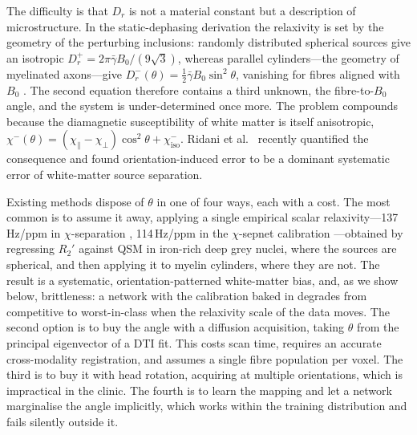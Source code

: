\documentclass[AMA,STIX2COL,Linenumberson]{MRM}
\begin{document}
The difficulty is that $D_r$ is not a material constant but a description of microstructure. In the static-dephasing derivation the relaxivity is set by the geometry of the perturbing inclusions: randomly distributed spherical sources give an isotropic $D_r^{+} = 2\pi\bar\gamma B_0/(9\sqrt{3})$, whereas parallel cylinders---the geometry of myelinated axons---give $D_r^{-}(\theta) = \tfrac{1}{2}\bar\gamma B_0 \sin^2\theta$, vanishing for fibres aligned with $B_0$ \cite{yablonskiy_theory_1994,brown_distribution_1961}. The second equation therefore contains a third unknown, the fibre-to-$B_0$ angle, and the system is under-determined once more. The problem compounds because the diamagnetic susceptibility of white matter is itself anisotropic, $\chi^{-}(\theta) = (\chi_{\parallel}-\chi_{\perp})\cos^{2}\theta + \chi^{-}_{\mathrm{iso}}$. Ridani et al.\ \cite{ridani_realistic_2026} recently quantified the consequence and found orientation-induced error to be a dominant systematic error of white-matter source separation.

Existing methods dispose of $\theta$ in one of four ways, each with a cost. The most common is to assume it away, applying a single empirical scalar relaxivity---137\,Hz/ppm in $\chi$-separation \cite{shin_chiseparation_2021}, 114\,Hz/ppm in the $\chi$-sepnet calibration \cite{kim_chisepnet_2025}---obtained by regressing $R_2'$ against QSM in iron-rich deep grey nuclei, where the sources are spherical, and then applying it to myelin cylinders, where they are not. The result is a systematic, orientation-patterned white-matter bias, and, as we show below, brittleness: a network with the calibration baked in degrades from competitive to worst-in-class when the relaxivity scale of the data moves. The second option is to buy the angle with a diffusion acquisition, taking $\theta$ from the principal eigenvector of a DTI fit. This costs scan time, requires an accurate cross-modality registration, and assumes a single fibre population per voxel. The third is to buy it with head rotation, acquiring at multiple orientations, which is impractical in the clinic. The fourth is to learn the mapping and let a network marginalise the angle implicitly, which works within the training distribution and fails silently outside it.
\end{document}
